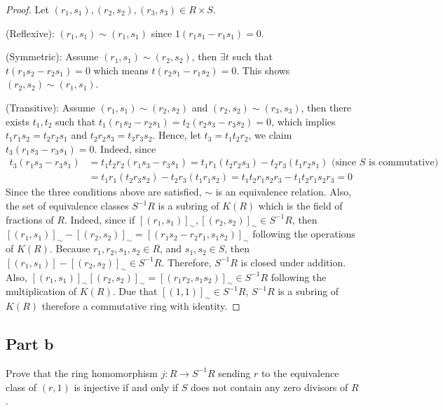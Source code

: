 \begin{answer}
    \begin{proof}
        Let $(r_1,s_1), (r_2,s_2), (r_3,s_3) \in R \times S$.
    
        (Reflexive): $(r_1,s_1) \sim (r_1,s_1)$ since $1(r_1s_1 - r_1s_1) = 0$.
        
        (Symmetric): Assume $(r_1,s_1) \sim (r_2,s_2)$, then $\exists t$ such that $t(r_1s_2-r_2s_1) = 0$ which means $t(r_2s_1-r_1s_2) = 0$. This shows $(r_2,s_2) \sim (r_1,s_1)$.
        
        (Transitive): Assume $(r_1,s_1) \sim (r_2,s_2)$ and $(r_2,s_2) \sim (r_3,s_3)$, then there exists $t_1,t_2$ such that $t_1(r_1s_2-r_2s_1) = t_2(r_2s_3 - r_3s_2) = 0$, which implies $t_1r_1s_2 = t_2r_2s_1$ and $t_2r_2s_3 = t_3r_3s_2$. Hence, let $t_3 = t_1t_2r_2$, we claim $t_3(r_1s_3-r_3s_1) = 0$. Indeed, since
        \begin{equation}
            \begin{aligned}
            t_3(r_1s_3-r_3s_1) &= t_1t_2r_2(r_1s_3-r_3s_1) = t_1r_1(t_2r_2s_3) - t_2r_3(t_1r_2s_1) \text{ (since $S$ is commutative)}\\
            &= t_1r_1(t_2r_3s_2) - t_2r_3(t_1r_1s_2) = t_1t_2r_1s_2r_3 - t_1t_2r_1s_2r_3 = 0
            \end{aligned}
        \end{equation}
        Since the three conditions above are satisfied, $\sim$ is an equivalence relation. Also, the set of equivalence classes $S^{-1}R$ is a subring of $K(R)$ which is the field of fractions of $R$. Indeed, since if $[(r_1,s_1)]_{\sim}, [(r_2,s_2)]_{\sim} \in S^{-1}R$, then $[(r_1,s_1)]_{\sim}-[(r_2,s_2)]_{\sim} = [(r_1s_2-r_2r_1,s_1s_2)]_{\sim}$ following the operations of $K(R)$. Because $r_1,r_2,s_1,s_2 \in R$, and $s_1,s_2 \in S$, then $[(r_1,s_1)] - [(r_2,s_2)]_{\sim} \in S^{-1}R$. Therefore, $S^{-1}R$ is closed under addition. Also, $[(r_1,s_1)]_{\sim}[(r_2,s_2)]_{\sim} = [(r_1r_2,s_1s_2)]_{\sim} \in S^{-1}R$ following the multiplication of $K(R)$. Due that $[(1,1)]_{\sim} \in S^{-1}R$, $S^{-1}R$ is a subring of $K(R)$ therefore a commutative ring with identity.
    \end{proof}
\end{answer}

\subsection{Part b}

\begin{question}
    Prove that the ring homomorphism $j: R \rightarrow S^{-1} R$ sending $r$ to the equivalence class of $(r, 1)$ is injective if and only if $S$ does not contain any zero divisors of $R$.
\end{question}


